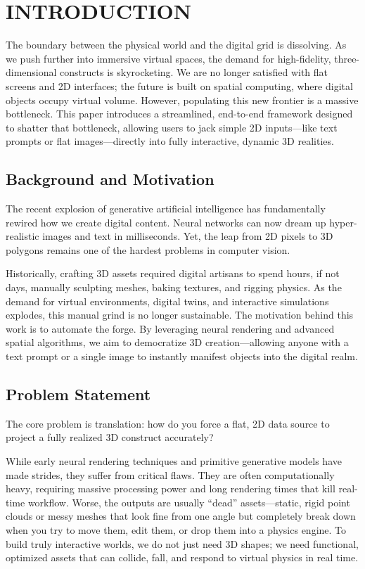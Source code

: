 

\section{INTRODUCTION}
The boundary between the physical world and the digital grid is dissolving. As we push further into immersive virtual spaces, the demand for high-fidelity, three-dimensional constructs is skyrocketing. We are no longer satisfied with flat screens and 2D interfaces; the future is built on spatial computing, where digital objects occupy virtual volume. However, populating this new frontier is a massive bottleneck. This paper introduces a streamlined, end-to-end framework designed to shatter that bottleneck, allowing users to jack simple 2D inputs---like text prompts or flat images---directly into fully interactive, dynamic 3D realities.

\subsection{Background and Motivation}
The recent explosion of generative artificial intelligence has fundamentally rewired how we create digital content. Neural networks can now dream up hyper-realistic images and text in milliseconds. Yet, the leap from 2D pixels to 3D polygons remains one of the hardest problems in computer vision.

Historically, crafting 3D assets required digital artisans to spend hours, if not days, manually sculpting meshes, baking textures, and rigging physics. As the demand for virtual environments, digital twins, and interactive simulations explodes, this manual grind is no longer sustainable. The motivation behind this work is to automate the forge. By leveraging neural rendering and advanced spatial algorithms, we aim to democratize 3D creation---allowing anyone with a text prompt or a single image to instantly manifest objects into the digital realm.

\subsection{Problem Statement}
The core problem is translation: how do you force a flat, 2D data source to project a fully realized 3D construct accurately?

While early neural rendering techniques and primitive generative models have made strides, they suffer from critical flaws. They are often computationally heavy, requiring massive processing power and long rendering times that kill real-time workflow. Worse, the outputs are usually ``dead'' assets---static, rigid point clouds or messy meshes that look fine from one angle but completely break down when you try to move them, edit them, or drop them into a physics engine. To build truly interactive worlds, we do not just need 3D shapes; we need functional, optimized assets that can collide, fall, and respond to virtual physics in real time.


